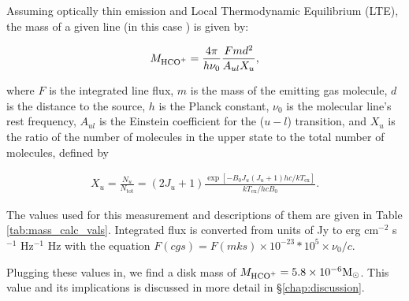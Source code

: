 Assuming optically thin emission and Local Thermodynamic Equilibrium (LTE), the mass of a given line (in this case \hco) is given by:

\begin{align}
  M_{\text{HCO$^+$}}= \frac{4 \pi}{h \nu_0} \frac{F m d^2}{A_{ul} X_u},
  \label{M_gas}
\end{align}

where $F$ is the integrated line flux, $m$ is the mass of the emitting gas molecule, $d$ is the distance to the source, $h$ is the Planck constant, $\nu_0$ is the molecular line's rest frequency, $A_{ul}$ is the Einstein coefficient for the ($u - l$) transition, and $X_u$ is the ratio of the number of molecules in the upper state to the total number of molecules, defined by

\begin{align}
  X_u = \frac{N_u}{N_{\text{tot}}} = (2 J_u + 1) \frac{\exp [-B_0 J_u (J_u + 1) h c/kT_{\text{ex}}]}{kT_{\text{ex}}/hc B_0}.
  \label{X_u}
\end{align}

\noindent The values used for this measurement and descriptions of them are given in Table \ref{tab:mass_calc_vals}. Integrated flux is converted from units of Jy \kms{} to erg cm$^{-2}$ s$^{-1}$ Hz$^{-1}$ Hz with the equation $F(cgs) = F(mks) \times 10^{-23} * 10^{5} \times \nu_{0}/c$.

Plugging these values in, we find a disk mass of $M_\text{HCO$^+$} = 5.8 \times 10^{-6} \text{M}_\odot$. This value and its implications is discussed in more detail in \S\ref{chap:discussion}.





